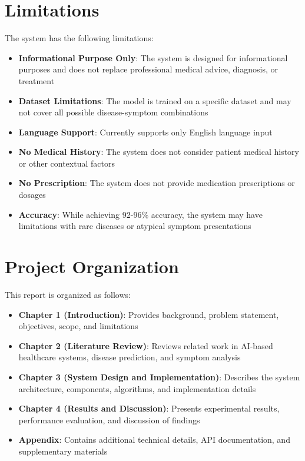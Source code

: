 \section{Limitations}
The system has the following limitations:

\begin{itemize}
    \item \textbf{Informational Purpose Only}: The system is designed for informational purposes and does not replace professional medical advice, diagnosis, or treatment
    \item \textbf{Dataset Limitations}: The model is trained on a specific dataset and may not cover all possible disease-symptom combinations
    \item \textbf{Language Support}: Currently supports only English language input
    \item \textbf{No Medical History}: The system does not consider patient medical history or other contextual factors
    \item \textbf{No Prescription}: The system does not provide medication prescriptions or dosages
    \item \textbf{Accuracy}: While achieving 92-96\% accuracy, the system may have limitations with rare diseases or atypical symptom presentations
\end{itemize}

\section{Project Organization}
This report is organized as follows:

\begin{itemize}
    \item \textbf{Chapter 1 (Introduction)}: Provides background, problem statement, objectives, scope, and limitations
    \item \textbf{Chapter 2 (Literature Review)}: Reviews related work in AI-based healthcare systems, disease prediction, and symptom analysis
    \item \textbf{Chapter 3 (System Design and Implementation)}: Describes the system architecture, components, algorithms, and implementation details
    \item \textbf{Chapter 4 (Results and Discussion)}: Presents experimental results, performance evaluation, and discussion of findings
    \item \textbf{Appendix}: Contains additional technical details, API documentation, and supplementary materials
\end{itemize}
